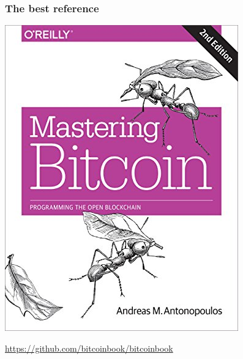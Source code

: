 \documentclass[11pt]{beamer}  %
\begin{document}
\begin{frame}\frametitle{The best reference}

  \begin{center}
    \includegraphics[scale=.35,clip=false]{pictures/mastering-bitcoin.jpg}
  \end{center}

  \begin{center}
    \url{https://github.com/bitcoinbook/bitcoinbook}
  \end{center}

\end{frame}
\end{document}
